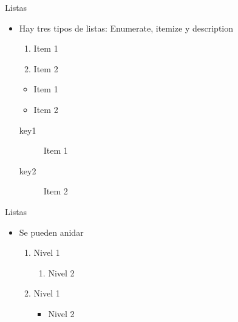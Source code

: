 \begin{frame}[fragile]{Listas}
  \begin{itemize}
    \item Hay tres tipos de listas: Enumerate, itemize y description
          \begin{latexexample}
            \begin{enumerate}
              \item Item 1
              \item Item 2
            \end{enumerate}
            \begin{itemize}
              \item Item 1
              \item Item 2
            \end{itemize}
            \begin{description}
              \item[key1] Item 1
              \item[key2] Item 2
            \end{description}
          \end{latexexample}
  \end{itemize}
\end{frame}

\begin{frame}[fragile]{Listas}
  \begin{itemize}
    \item Se pueden anidar
          \begin{latexexample}
            \begin{enumerate}
              \item Nivel 1
                    \begin{enumerate}
                      \item Nivel 2
                    \end{enumerate}
              \item Nivel 1
                    \begin{itemize}
                      \item Nivel 2
                    \end{itemize}
            \end{enumerate}
          \end{latexexample}
  \end{itemize}
\end{frame}

